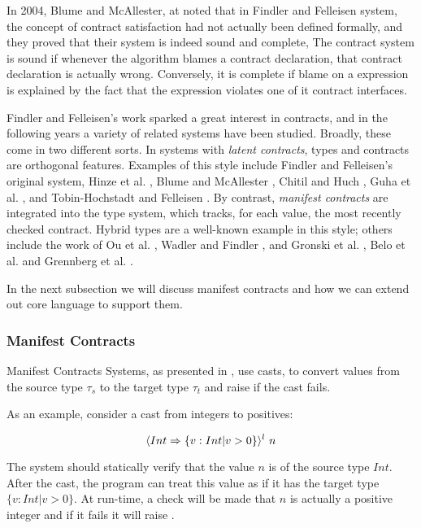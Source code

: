 In 2004, Blume and McAllester, at \cite{BlumeM06} noted that 
in Findler and Felleisen system,
the concept of contract satisfaction had not actually been defined
formally, and they proved that their system is indeed
sound and complete, 
%
The contract system is sound if whenever
the algorithm blames a contract declaration, 
that contract declaration is actually wrong.
%
Conversely, it is complete if blame on a expression is explained
by the fact that the expression violates one of it contract interfaces.

Findler and Felleisen's work sparked a great interest
in contracts, and in the following years a variety
of related systems have been studied. 
Broadly, these come in two different sorts. 
%
In systems with \textit{latent contracts}, types and contracts
are orthogonal features. Examples of this style include Findler
and Felleisen's original system, Hinze et al. \cite{Hinze06}, Blume and
McAllester \cite{BlumeM06}, Chitil and Huch \cite{ChitilH07}, Guha et al. \cite{GuhaMFK07},
and Tobin-Hochstadt and Felleisen \cite{Tobin-HochstadtF08}. 
By contrast, \textit{manifest contracts} are integrated into the type system, 
which tracks, for each value, the most recently checked contract. 
Hybrid types \cite{flanagan06} are a well-known example in this style; others include the
work of Ou et al. \cite{Ou2004}, Wadler and Findler \cite{WadlerF09}, and Gronski
et al. \cite{Gronski06}, Belo et al. \cite{Greenberg11} and Grennberg et al. \cite{Greenberg12}.

In the next subsection we will discuss manifest contracts and
how we can extend out core language to support them.

\subsubsection{Manifest Contracts}

Manifest Contracts Systems, as presented in \cite{Greenberg12}, use casts,
to convert values from the source type $\tau_s$ 
to the target type $\tau_t$ and raise 
if the cast fails.

As an example, consider a cast from integers to positives:

$$
\ecast{Int}{\{v:Int | v > 0\}}{l} \ n
$$

The system should statically verify that the value $n$ is 
of the source type $Int$.
After the cast, the program can treat this value as
if it has the target type $\{v:Int | v > 0\}$.
At run-time, a check will be made that $n$ 
is actually a positive integer and if it fails it will raise .

